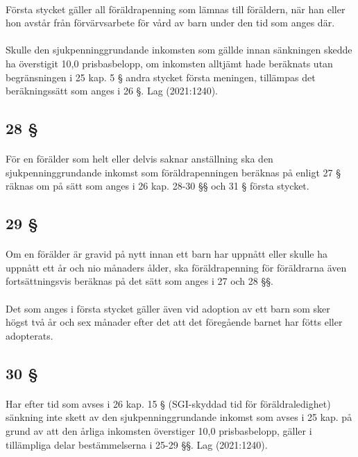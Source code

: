\documentclass[a4paper,notitlepage,openany,10pt]{book}
\begin{document}
\paragraph*{}
Första stycket gäller all föräldrapenning som lämnas till föräldern, när han eller hon avstår från förvärvsarbete för vård av barn under den tid som anges där.
\paragraph*{}
Skulle den sjukpenninggrundande inkomsten som gällde innan sänkningen skedde ha överstigit 10,0 prisbasbelopp, om inkomsten alltjämt hade beräknats utan begränsningen i 25 kap. 5 § andra stycket första meningen, tillämpas det beräkningssätt som anges i 26 §.
Lag (2021:1240).
\subsection*{28 §}
\paragraph*{}
För en förälder som helt eller delvis saknar anställning ska den sjukpenninggrundande inkomst som föräldrapenningen beräknas på enligt 27 § räknas om på sätt som anges i 26 kap. 28-30 §§ och 31 § första stycket.
\subsection*{29 §}
\paragraph*{}
Om en förälder är gravid på nytt innan ett barn har uppnått eller skulle ha uppnått ett år och nio månaders ålder, ska föräldrapenning för föräldrarna även fortsättningsvis beräknas på det sätt som anges i 27 och 28 §§.
\paragraph*{}
Det som anges i första stycket gäller även vid adoption av ett barn som sker högst två år och sex månader efter det att det föregående barnet har fötts eller adopterats.
\subsection*{30 §}
\paragraph*{}
Har efter tid som avses i 26 kap. 15 § (SGI-skyddad tid för föräldraledighet) sänkning inte skett av den sjukpenninggrundande inkomst som avses i 25 kap. på grund av att den årliga inkomsten överstiger 10,0 prisbasbelopp, gäller i tillämpliga delar bestämmelserna i 25-29 §§.
Lag (2021:1240).
\end{document}

